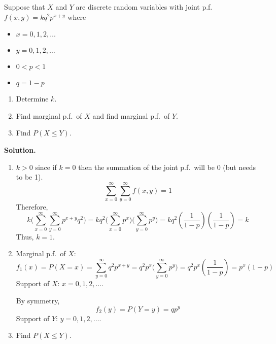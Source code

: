 \begin{Example}{}{}
    Suppose that $ X $ and $ Y $ are discrete random variables
    with joint p.f.\ $ f(x,y)=kq^2 p^{x+y} $ where
    \begin{itemize}
        \item $ x=0,1,2,\ldots $
        \item $ y=0,1,2,\ldots $
        \item $ 0<p<1 $
        \item $ q=1-p $
    \end{itemize}
    \begin{enumerate}[label=(\roman*)]
        \item Determine $ k $.
        \item Find marginal p.f.\ of $ X $ and
              find marginal p.f.\ of $ Y $.
        \item Find $ P(X\leqslant Y) $.
    \end{enumerate}
    \textbf{Solution.}
    \begin{enumerate}[label=(\roman*)]
        \item $ k>0 $ since if $ k=0 $ then the summation
              of the joint p.f.\ will be 0 (but needs to be 1).
              \[\sum\limits_{x=0}^{\infty}
                  \sum\limits_{y=0}^{\infty} f(x,y)=1\]
              Therefore,
              \[k\biggl(\sum\limits_{x=0}^{\infty}
                  \sum\limits_{y=0}^{\infty} p^{x+y}q^2\biggr)=
                  kq^2\biggl(\sum\limits_{x=0}^{\infty} p^x\biggr)
                  \biggl(\sum\limits_{y=0}^{\infty}p^y\biggr)=kq^2
                  \left( \frac{1}{1-p}  \right)\left( \frac{1}{1-p} \right)=k
              \]
              Thus, $ k=1 $.
        \item Marginal p.f.\ of $ X $:
              \[ f_1(x)=P(X=x)=
                  \sum\limits_{y=0}^{\infty} q^2p^{x+y}=
                  q^2 p^x
                  \biggl(\sum\limits_{y=0}^{\infty} p^y \biggr)
                  =q^2 p^x \left( \frac{1}{1-p}  \right)=p^x(1-p) \]
              Support of $ X $: $ x=0,1,2,\ldots $.

              By symmetry,
              \[ f_2(y)=P(Y=y)=qp^y \]
              Support of $ Y $: $ y=0,1,2,\ldots $.
        \item Find $ P(X\leqslant Y) $.


\end{enumerate}
\end{Example}
